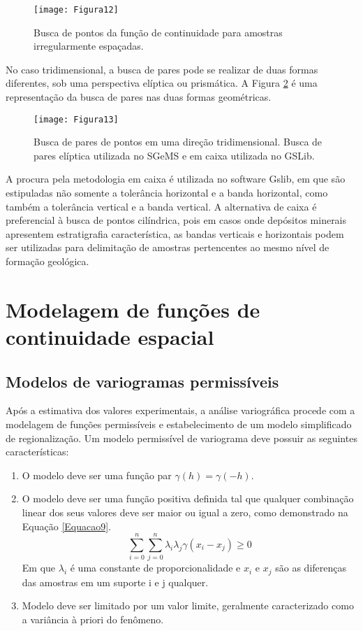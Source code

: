 \begin{figure}[H]
	\centering
	\texttt{[image: Figura12]}
	\caption{Busca de pontos da função de continuidade para amostras irregularmente espaçadas.}
	\label{Figura12}
\end{figure}

No caso tridimensional, a busca de pares pode se realizar de duas formas diferentes, sob uma perspectiva elíptica ou prismática. A Figura \ref{Figura13} é uma representação da busca de pares nas duas formas geométricas. 


\begin{figure}[H]
	\centering
	\texttt{[image: Figura13]}
	\caption{Busca de pares de pontos em uma direção tridimensional. Busca de pares elíptica utilizada no SGeMS e em caixa utilizada no GSLib.}
	\label{Figura13}
\end{figure}

A procura pela metodologia em caixa é utilizada no software Gslib, em que são estipuladas não somente a tolerância horizontal e a banda horizontal, como também a tolerância vertical e a banda vertical. A alternativa de caixa é preferencial à busca de pontos cilíndrica, pois em casos onde depósitos minerais apresentem estratigrafia característica, as bandas verticais e horizontais podem ser utilizadas para delimitação de amostras pertencentes ao mesmo nível de formação geológica. 

\section{Modelagem de funções de continuidade espacial}

\subsection{Modelos de variogramas permissíveis}

Após a estimativa dos valores experimentais, a análise variográfica procede com a modelagem de funções permissíveis e estabelecimento de um modelo simplificado de regionalização. Um modelo permissível de variograma deve possuir as seguintes características: 

\begin{enumerate}
	\item 	O modelo  deve ser uma função par $\gamma(h)= \gamma(-h)$.
	\item O modelo deve ser uma função positiva definida tal que qualquer combinação linear dos seus valores deve ser maior ou igual a zero, como demonstrado na Equação \ref{Equacao9}.
	\begin{equation}\label{Equacao9}
	\sum_{i=0}^{n}\sum_{j=0}^{n}\lambda_i\lambda_j\gamma(x_i-x_j) \geq 0
	\end{equation}
	Em que $\lambda_i$ é uma constante de proporcionalidade e $x_i$ e $x_j$ são as diferenças das amostras em um suporte i e j qualquer.
	\item Modelo deve ser limitado por um valor limite, geralmente caracterizado como a variância à priori do fenômeno.
	
\end{enumerate}


